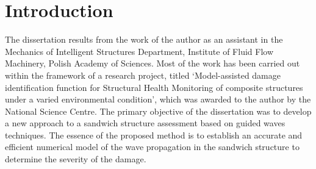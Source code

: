 

\chapter[Introduction]{Introduction}
\label{ch:intro}
The dissertation results from the work of the author as an assistant in the Mechanics of Intelligent Structures Department, Institute of Fluid Flow Machinery, Polish Academy of Sciences.
Most of the work has been carried out within the framework of a research project, titled ‘Model-assisted damage identification function for Structural Health Monitoring of composite structures under a varied environmental condition’, which was awarded to the author by the National Science Centre.
The primary objective of the dissertation was to develop a new approach to a sandwich structure assessment based on guided waves techniques.
The essence of the proposed method is to establish an accurate and efficient numerical model of the wave propagation in the sandwich structure to determine the severity of the damage.





